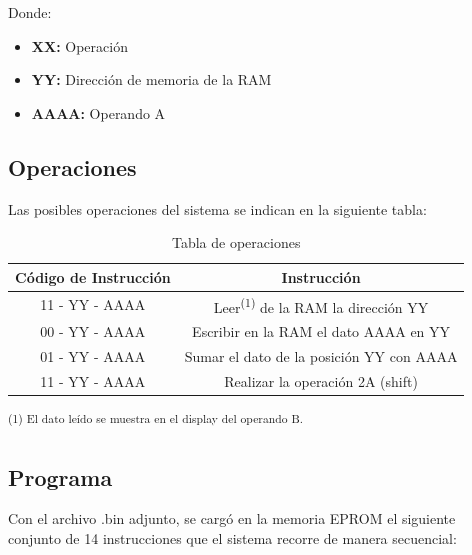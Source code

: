 \documentclass{sciposter}
\begin{document}
\begin{multicols*}{2}
Donde: 

\begin{itemize}
    \item \textbf{XX:} Operación
    \item \textbf{YY:} Dirección de memoria de la RAM
    \item \textbf{AAAA:} Operando A
\end{itemize}

\subsection{Operaciones}
Las posibles operaciones del sistema se indican en la siguiente tabla:

\begin{table}[h]
    \centering
    \renewcommand{\arraystretch}{1.3} 
    \begin{tabular}{|c|c|}
        \hline
        \textbf{Código de Instrucción} & \textbf{Instrucción} \\ 
        \hline
        11 - YY - AAAA & Leer\textsuperscript{(1)} de la RAM la dirección YY \\ 
        00 - YY - AAAA & Escribir en la RAM el dato AAAA en YY \\ 
        01 - YY - AAAA & Sumar el dato de la posición YY con AAAA \\ 
        11 - YY - AAAA & Realizar la operación 2A (shift) \\ 
        \hline
    \end{tabular}
    \caption{Tabla de operaciones}
    \label{tab:operaciones}
\end{table}

\textsuperscript{(1) El dato leído se muestra en el display del operando B.}\\


\subsection{Programa}

Con el archivo .bin adjunto, se cargó en la memoria EPROM el siguiente conjunto de 14 instrucciones que el sistema recorre de manera secuencial:


\end{multicols*}
\end{document}
